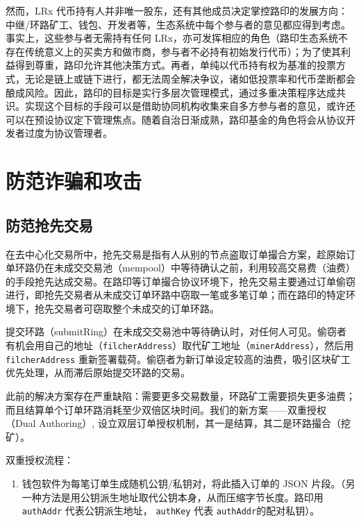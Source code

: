 \documentclass[UTF8,nofonts]{ctexart}%
\begin{document}
\begin{multicols}{2}
然而，LRx 代币持有人并非唯一股东，还有其他成员决定掌控路印的发展方向：中继/环路矿工、钱包、开发者等，生态系统中每个参与者的意见都应得到考虑。事实上，这些参与者无需持有任何 LRx，亦可发挥相应的角色（路印生态系统不存在传统意义上的买卖方和做市商，参与者不必持有初始发行代币）；为了使其利益得到尊重，路印允许其他决策方式。再者，单纯以代币持有权为基准的投票方式，无论是链上或链下进行，都无法周全解决争议，诸如低投票率和代币垄断都会酿成风险。因此，路印的目标是实行多层次管理模式，通过多重决策程序达成共识。实现这个目标的手段可以是借助协同机构收集来自多方参与者的意见，或许还可以在预设协议定下管理焦点。随着自治日渐成熟，路印基金的角色将会从协议开发者过度为协议管理者。

\section{防范诈骗和攻击}

\subsection{防范抢先交易\label{sec:dual_authoring}}

在去中心化交易所中，抢先交易是指有人从别的节点盗取订单撮合方案，趁原始订单环路仍在未成交交易池（mempool）中等待确认之前，利用较高交易费（油费）的手段抢先达成交易。在路印等订单撮合协议环境下，抢先交易主要通过订单偷窃进行，即抢先交易者从未成交订单环路中窃取一笔或多笔订单；而在路印的特定环境下，抢先交易者可窃取整个未成交的订单环路。


提交环路（submitRing）在未成交交易池中等待确认时，对任何人可见。偷窃者有机会用自己的地址（\verb|filcherAddress|）取代矿工地址（\verb|minerAddress|），然后用 \verb|filcherAddress| 重新签署载荷。偷窃者为新订单设定较高的油费，吸引区块矿工优先处理，从而滞后原始提交环路的交易。

此前的解决方案存在严重缺陷：需要更多交易数量，环路矿工需要损失更多油费；而且结算单个订单环路消耗至少双倍区块时间。我们的新方案——双重授权（Dual Authoring）\cite{dualauthor}, 设立双层订单授权机制，其一是结算，其二是环路撮合（挖矿）。

双重授权流程：

\begin{enumerate}

	\item 钱包软件为每笔订单生成随机公钥/私钥对，将此插入订单的 JSON 片段。（另一种方法是用公钥派生地址取代公钥本身，从而压缩字节长度。路印用 \verb|authAddr| 代表公钥派生地址， \verb|authKey| 代表 \verb|authAddr|的配对私钥）。


\end{enumerate}
\end{multicols}
\end{document}
